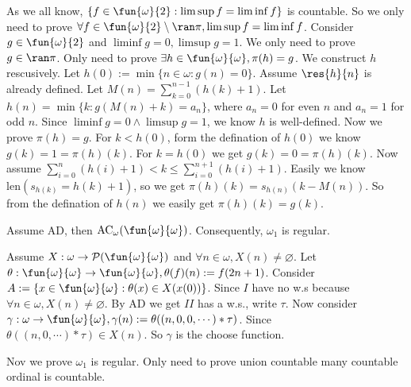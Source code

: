 \documentclass{ctexart}
\begin{document}
\begin{solution}
  As we all know, \(\{f \in \fun{\omega}{2}:\limsup f=\liminf f\}\) is countable. So we only need to prove \(\forall f \in \fun{\omega}{2}\setminus \ran \pi,\limsup f = \liminf f\). 
  Consider \(g \in \fun{\omega}{2}\) and \(\liminf g=0,\limsup g=1\). We only need to prove \(g \in \ran \pi\). 
  Only need to prove \(\exists h \in \fun{ \omega}{\omega},\pi(h)=g\). 
  We construct \(h\) rescusively. Let \(h(0):=\min\{n \in \omega:g(n)=0\}\). 
  Assume \(\res{h}{n}\) is already defined. Let \(M(n)=\sum_{k=0}^{n-1} (h(k)+1) \). 
  Let \(h(n)= \min\{k:g(M(n)+k)=a_n\}\), where \(a_n=0\) for even \(n\) and \(a_n=1\) for odd \(n\). 
  Since \(\liminf g=0 \wedge \limsup g=1\), we know \(h\) is well-defined. Now we prove \(\pi(h)=g\). 
  For \(k<h(0)\), form the defination of \(h(0)\) we know \(g(k)=1=\pi(h)(k)\). 
  For \(k=h(0)\) we get \(g(k)=0=\pi(h)(k)\). 
  Now assume \(\sum_{i=0}^{n} (h(i)+1) <k \leq \sum_{i=0}^{n+1} (h(i)+1)\). 
  Easily we know \(\mathrm{len}(s_{h(k)}=h(k)+1)\), so we get \(\pi(h)(k)=s_{h(n)}(k-M(n) )\). 
  So from the defination of \(h(n)\) we easily get \(\pi(h)(k)=g(k)\). 
\end{solution}

\begin{problem}
  Assume AD, then \(\mathrm{AC}_\omega(\fun{\omega}{\omega}) \). Consequently, \(\omega_1\) is regular. 
\end{problem}

\begin{solution}
  Assume \(X:\omega \to \mathcal{P}(\fun{\omega}{\omega})\) and \(\forall n \in \omega,X(n)\neq \varnothing\). 
  Let \(\theta:\fun{\omega}{\omega}\to \fun{\omega}{\omega},\theta(f)(n):=f(2n+1)\). 
  Consider \(A:=\{x \in \fun{\omega}{\omega}:\theta(x) \in X(x(0))\}\). 
  Since \(I\) have no w.s because \(\forall n \in \omega,X(n)\neq \varnothing\). 
  By AD we get \(II\) has a w.s., write \(\tau\). 
  Now consider \(\gamma:\omega \to \fun{\omega}{\omega},\gamma(n):=\theta((n,0,0,\cdots)*\tau)\). 
  Since \(\theta((n,0,\cdots)*\tau) \in X(n)\). So \(\gamma\) is the choose function. 
  
  Nov we prove \(\omega_1\) is regular. Only need to prove union countable many countable ordinal is countable. 
  
\end{solution}
\fi
\end{document}
